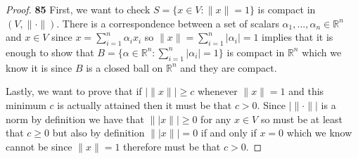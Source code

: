\documentclass[11pt]{article}
\newcommand{\R}{\mathbb{R}}
\theoremstyle{definition}
\begin{document}
    \begin{proof}{\textbf{85}}
        First, we want to  check $S = \{x \in V: \|x\| = 1\}$ is compact in
        $(V, \|\cdot\|)$. There is a correspondence between
        a set of scalars $\alpha_1,...,\alpha_n \in \R^n$ and $x\in V$ since
        $x = \sum_{i=1}^n \alpha_i x_i$ so
        $\|x\| = \sum_{i=1}^n |\alpha_i| = 1$
        implies that it is enough to show that
        $B = \{\alpha \in \R^n : \sum_{i=1}^n |\alpha_i| = 1\}$
        is compact in $\R^n$ which we know it is since $B$ is a closed ball on
        $\R^n$ and they are compact.

        Lastly, we want to prove that if $|\|x\|| \geq c$ whenever $\|x\| = 1$
        and this minimum $c$ is actually attained then it must be that $c > 0$.
        Since $|\|\cdot\||$ is a norm by
        definition we have that $\||x\|| \geq 0$ for any $x \in V$ so
        must be at least that $c \geq 0$
        but also by definition $\||x\|| = 0$ if and only if $x = 0$ which we
        know cannot be since $\|x\| = 1$ therefore must be that $c > 0$.
    \end{proof}
    \cleardoublepage
\end{document}
